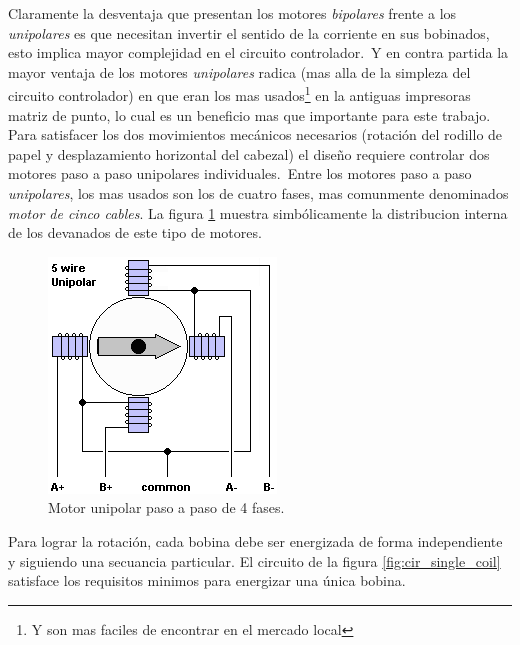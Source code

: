 Claramente la desventaja que presentan los motores \emph{bipolares} frente a
los \emph{unipolares} es que necesitan invertir el sentido de la corriente en
sus bobinados, esto implica mayor complejidad en el circuito controlador.\
Y en contra partida la mayor ventaja de los motores \emph{unipolares} radica
(mas alla de la simpleza del circuito controlador) en que eran los mas
usados\footnote{Y son mas faciles de encontrar en el mercado local} en la
antiguas impresoras matriz de punto, lo cual es un beneficio mas que importante
para este trabajo.\\

Para satisfacer los dos movimientos mec\'anicos necesarios (rotaci\'on del
rodillo de papel y desplazamiento horizontal del cabezal) el dise\~no requiere
controlar dos motores paso a paso unipolares individuales.\
Entre los motores paso a paso \emph{unipolares}, los mas usados son los de
cuatro fases, mas comunmente denominados \emph{motor de cinco cables}. La
figura \ref{fig:stepper_motor_5_wire} muestra simb\'olicamente la distribucion
interna de los devanados de este tipo de motores.

\begin{figure}[htp]
\centering
\includegraphics[scale=0.5]{./img/5wire.png}
\caption{Motor unipolar paso a paso de 4 fases.}
\label{fig:stepper_motor_5_wire}
\end{figure}

Para lograr la rotaci\'on, cada bobina debe ser energizada de forma
independiente y siguiendo una secuancia particular. El circuito de la figura
\ref{fig:cir_single_coil} satisface los requisitos minimos para energizar una
\'unica bobina.


